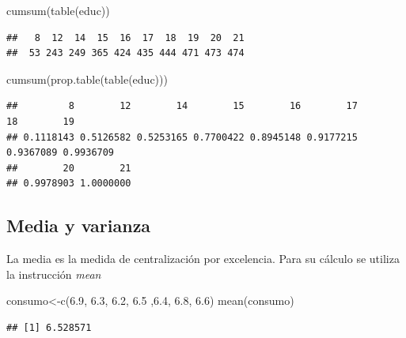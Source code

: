 \documentclass[
]{book}
\newenvironment{Shaded}{\begin{snugshade}}{\end{snugshade}}
\newcommand{\FloatTok}[1]{\textcolor[rgb]{0.00,0.00,0.81}{#1}}
\newcommand{\FunctionTok}[1]{\textcolor[rgb]{0.00,0.00,0.00}{#1}}
\newcommand{\NormalTok}[1]{#1}
\newcommand{\OtherTok}[1]{\textcolor[rgb]{0.56,0.35,0.01}{#1}}
\theoremstyle{break}
\theoremstyle{nonumberplain}
\begin{document}
\begin{Shaded}
\begin{Highlighting}[]
\FunctionTok{cumsum}\NormalTok{(}\FunctionTok{table}\NormalTok{(educ))}
\end{Highlighting}
\end{Shaded}

\begin{verbatim}
##   8  12  14  15  16  17  18  19  20  21 
##  53 243 249 365 424 435 444 471 473 474
\end{verbatim}

\begin{Shaded}
\begin{Highlighting}[]
\FunctionTok{cumsum}\NormalTok{(}\FunctionTok{prop.table}\NormalTok{(}\FunctionTok{table}\NormalTok{(educ)))}
\end{Highlighting}
\end{Shaded}

\begin{verbatim}
##         8        12        14        15        16        17        18        19 
## 0.1118143 0.5126582 0.5253165 0.7700422 0.8945148 0.9177215 0.9367089 0.9936709 
##        20        21 
## 0.9978903 1.0000000
\end{verbatim}

\hypertarget{media-y-varianza}{%
\subsection{Media y varianza}\label{media-y-varianza}}

La media es la medida de centralización por excelencia. Para su cálculo
se utiliza la instrucción \emph{mean}

\begin{Shaded}
\begin{Highlighting}[]
\NormalTok{consumo}\OtherTok{\textless{}{-}}\FunctionTok{c}\NormalTok{(}\FloatTok{6.9}\NormalTok{, }\FloatTok{6.3}\NormalTok{, }\FloatTok{6.2}\NormalTok{, }\FloatTok{6.5}\NormalTok{ ,}\FloatTok{6.4}\NormalTok{, }\FloatTok{6.8}\NormalTok{, }\FloatTok{6.6}\NormalTok{)}
\FunctionTok{mean}\NormalTok{(consumo)}
\end{Highlighting}
\end{Shaded}

\begin{verbatim}
## [1] 6.528571
\end{verbatim}
\end{document}
